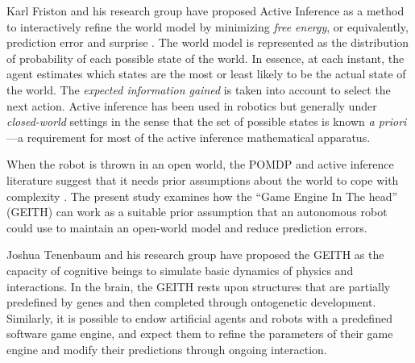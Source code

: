 \documentclass[runningheads]{llncs}
\begin{document}
Karl Friston and his research group have proposed Active Inference \cite[e.g.]{smith_step-by-step_2022} as a method to interactively refine the world model by minimizing \textit{free energy}, or equivalently, prediction error and surprise \cite{friston_free-energy_2010}.
The world model is represented as the distribution of probability of each possible state of the world. 
In essence, at each instant, the agent estimates which states are the most or least likely to be the actual state of the world.
The \textit{expected information gained} is taken into account to select the next action.
Active inference has been used in robotics \cite{lanillos_active_2021} but generally under \textit{closed-world} settings in the sense that the set of possible states is known \textit{a priori}---a requirement for most of the active inference mathematical apparatus. 

When the robot is thrown in an open world, 
the POMDP and active inference literature suggest that it needs prior assumptions about the world to cope with complexity \cite{georgeon_artificial_2024}. 
The present study examines how the ``Game Engine In The head'' (GEITH) can work as a suitable prior assumption that an autonomous robot could use to maintain an open-world model and reduce prediction errors. 

Joshua Tenenbaum and his research group have proposed the GEITH \cite{battaglia_simulation_2013} as the capacity of cognitive beings to simulate basic dynamics of physics and interactions. 
In the brain, the GEITH rests upon structures that are partially predefined by genes and then completed through ontogenetic development.  
Similarly, it is possible to endow artificial agents and robots with a predefined software game engine, and expect them to refine the parameters of their game engine and modify their predictions through ongoing interaction.
\end{document}
